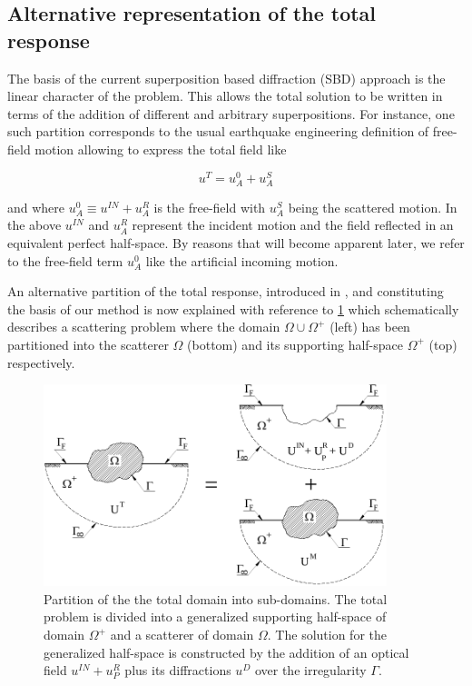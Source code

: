 \documentclass[11pt,letterpaper]{article}
\begin{document}
\subsection*{Alternative representation of the total response}

The basis of the current superposition based diffraction (SBD) approach is the linear character of the problem. This allows the total solution to be written in terms of the addition of different and arbitrary superpositions. For instance, one such partition corresponds to the usual earthquake engineering definition of free-field motion allowing to express the total field like

\begin{equation}
\label{free field}
{u^T}={u^0_A}+{u^S_A}
\end{equation}

and where $u^0_A\equiv u^{IN}+u^R_A$ is the free-field with $u^S_A$ being the scattered motion. In the above $u^{IN}$ and ${u^R_A}$  represent the incident motion and the field reflected in an equivalent perfect half-space. By reasons that will become apparent later, we refer to the free-field term $u^0_A$ like the artificial incoming motion.


An alternative partition of the total response, introduced in \cite{gomez2013analysis}, and constituting the basis of our method is now explained with reference to \cref{fig:part} which schematically describes a scattering problem where the domain $\Omega \cup \Omega^+$ (left) has been partitioned into the scatterer $\Omega$ (bottom) and its supporting half-space $\Omega^+$ (top) respectively.

\begin{figure}[H]
\centering
\includegraphics[width=10cm]{IMAGES/mec.pdf}
\caption{Partition of the the total domain into sub-domains. The total problem is divided into a generalized supporting half-space of domain $\Omega^+$ and a scatterer of domain $\Omega$. The solution for the generalized half-space is constructed by the addition of an optical field $u^{IN}+u_P^R$ plus its diffractions $u^D$ over the irregularity $\Gamma$.
\label{fig:part}}
\end{figure}
\end{document}
